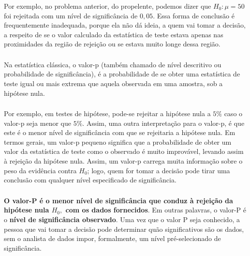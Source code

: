 \documentclass[14pt,aspectratio=1610]{beamer}
\newcommand{\Ho}{\ensuremath{H_{0}}}
\begin{document}
\begin{frame}{}
\frametitle{}
\begin{block}{}
\justifying
Por exemplo, no problema anterior, do propelente, podemos dizer que $\Ho: \mu = 50$ foi rejeitada com um nível de significância de $0,05.$ Essa forma de conclusão é 
frequentemente inadequada, porque ela não dá ideia, a quem vai tomar a decisão, a respeito de se o valor calculado da estatística de teste estava apenas nas proximidades 
da região de rejeição ou se estava muito longe dessa região. 
\end{block}
\end{frame}

\begin{frame}{}
\frametitle{}
\begin{block}{}
\justifying
Na estatística clássica, o valor-p (também chamado de nível descritivo ou probabilidade de significância), é a probabilidade de se obter uma estatística de teste igual 
ou mais extrema que aquela observada em uma amostra, sob a hipótese nula.
\end{block}
\end{frame}

\begin{frame}{}
\frametitle{}
\begin{block}{}
\justifying
Por exemplo, em testes de hipótese, pode-se rejeitar a hipótese nula a $5\%$ caso o valor-p seja menor que $5\%.$ Assim, uma outra interpretação para o valor-p, é 
que este é o menor nível de significância com que se rejeitaria a hipótese nula. Em termos gerais, um valor-p pequeno significa que a probabilidade de obter um valor da 
estatística de teste como o observado é muito improvável, levando assim à rejeição da hipótese nula. Assim, um valor-p carrega muita informação sobre o peso da 
evidência contra $\Ho$; logo, quem for tomar a decisão pode tirar uma conclusão com qualquer nível especificado de significância. 
\end{block}
\end{frame}

\begin{frame}{}
\frametitle{}
\begin{block}{}
\justifying
\textbf{O valor-P é o menor nível de significância que conduz à rejeição da hipótese nula $\Ho,$ com os dados fornecidos}. Em outras palavras, o valor-P é o 
\textbf{nível de significância observado}. Uma vez que o valor P seja conhecido, a pessoa que vai tomar a decisão pode determinar quão significativos são os dados, 
sem o analista de dados impor, formalmente, um nível pré-selecionado de significância.
\end{block}
\end{frame}
\end{document}
